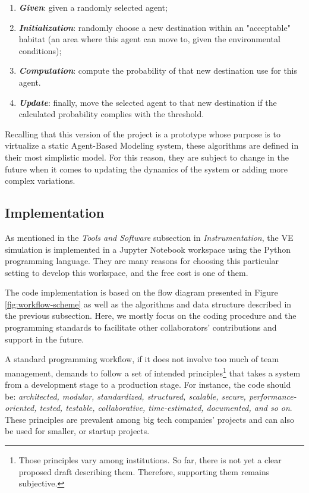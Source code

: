 \begin{enumerate}
    \item \textbf{\textit{Given}}: given a randomly selected agent;
    \item \textbf{\textit{Initialization}}: randomly choose a new destination within an "acceptable" habitat (an area where this agent can move to, given the environmental conditions);
    \item \textbf{\textit{Computation}}: compute the probability of that new destination use for this agent.
    \item \textbf{\textit{Update}}: finally, move the selected agent to that new destination if the calculated probability complies with the threshold.
\end{enumerate}

Recalling that this version of the project is a prototype whose purpose is to virtualize a static Agent-Based Modeling system, these algorithms are defined in their most simplistic model. For this reason, they are subject to change in the future when it comes to updating the dynamics of the system or adding more complex variations.

\subsection{Implementation}
As mentioned in the \emph{Tools and Software} subsection in \emph{Instrumentation}, the VE simulation is implemented in a Jupyter Notebook workspace using the Python programming language. They are many reasons for choosing this particular setting to develop this workspace, and the free cost is one of them.

The code implementation is based on the flow diagram presented in Figure \ref{fig:workflow-scheme} as well as the algorithms and data structure described in the previous subsection. Here, we mostly focus on the coding procedure and the programming standards to facilitate other collaborators' contributions and support in the future.

A standard programming workflow, if it does not involve too much of team management, demands to follow a set of intended principles\footnote{Those principles vary among institutions. So far, there is not yet a clear proposed draft describing them. Therefore, supporting them remains subjective.} that takes a system from a development stage to a production stage. For instance, the code should be: \textit{architected, modular, standardized, structured, scalable, secure, performance-oriented, tested, testable, collaborative, time-estimated, documented, and so on}\cite{smashingmagazine}. These principles are prevalent among big tech companies' projects and can also be used for smaller, or startup projects.

